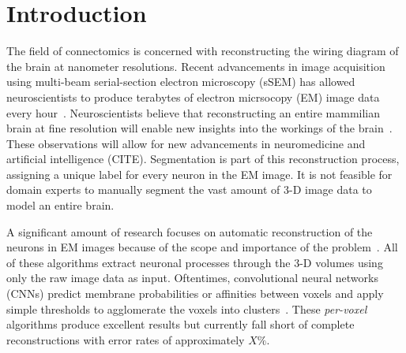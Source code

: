 \section{Introduction}

The field of connectomics is concerned with reconstructing the wiring diagram of the brain at nanometer resolutions. 
Recent advancements in image acquisition using multi-beam serial-section electron microscopy (sSEM) has allowed neuroscientists to produce terabytes of electron micrsocopy (EM) image data every hour~\cite{hildebrand2017whole}.
Neuroscientists believe that reconstructing an entire mammilian brain at fine resolution will enable new insights into the workings of the brain~\cite{kasthuri2015saturated}. 
These observations will allow for new advancements in neuromedicine and artificial intelligence (CITE). 
Segmentation is part of this reconstruction process, assigning a unique label for every neuron in the EM image. 
It is not feasible for domain experts to manually segment the vast amount of 3-D image data to model an entire brain.

A significant amount of research focuses on automatic reconstruction of the neurons in EM images because of the scope and importance of the problem~\cite{seymour2016rhoananet,nunez2014graph,parag2017anisotropic,zlateski2015image}.%
All of these algorithms extract neuronal processes through the 3-D volumes using only the raw image data as input.
Oftentimes, convolutional neural networks (CNNs) predict membrane probabilities or affinities between voxels and apply simple thresholds to agglomerate the voxels into clusters~\cite{lee2015recursive,ronneberger2015u}.
These \textit{per-voxel} algorithms produce excellent results but currently fall short of complete reconstructions with error rates of approximately $X\%$. %


